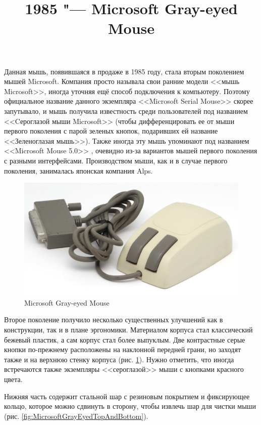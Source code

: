 \documentclass[11pt, a4paper]{article}
\begin{document}
\title{1985 "--- Microsoft Gray-eyed Mouse}
\date{}
\maketitle
{}

Данная мышь, появившаяся в продаже в 1985 году, стала вторым поколением мышей Microsoft. Компания просто называла свои ранние модели <<мышь Microsoft>>, иногда уточняя ещё способ подключения к компьютеру. Поэтому официальное название данного экземпляра <<Microsoft Serial Mouse>> скорее запутывало, и мышь получила известность среди пользователей под названием <<Cероглазой мыши Microsoft>> (чтобы дифференцировать ее от мыши первого поколения с парой зеленых кнопок, подаривших ей название <<Зеленоглазая мышь>>). Также иногда эту мышь упоминают под названием <<Microsoft Mouse 5.0>> \cite{mouses}, очевидно из-за вариантов мышей первого поколения с разными интерфейсами. Производством мыши, как и в случае первого поколения, занималась японская компания Alps.

\begin{figure}[h]
   \centering
    \includegraphics[scale=0.5]{1985_microsoft_gray_eyed_mouse/pic_30.jpg}
    \caption{Microsoft Gray-eyed Mouse}
    \label{fig:MicrosoftGrayEyedPic}
\end{figure}

Второе поколение получило несколько существенных улучшений как в конструкции, так и в плане эргономики. Материалом корпуса стал классический бежевый пластик, а сам корпус стал более выпуклым. Две контрастные серые кнопки по-прежнему расположены на наклонной передней грани, но заходят также и на верхнюю стенку корпуса (рис.  \ref{fig:MicrosoftGrayEyedPic}). Нужно отметить, что иногда встречаются также экземпляры <<сероглазой>> мыши с кнопками красного цвета.

Нижняя часть содержит стальной шар с резиновым покрытием и фиксирующее кольцо, которое можно сдвинуть в сторону, чтобы извлечь шар для чистки мыши (рис. \ref{fig:MicrosoftGrayEyedTopAndBottom}).
\end{document}
